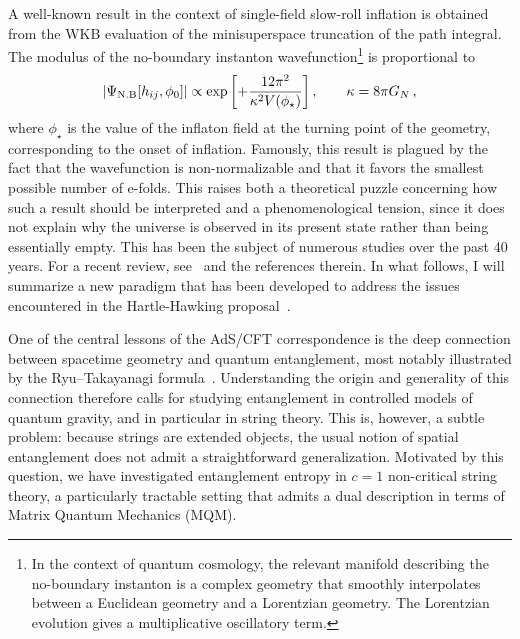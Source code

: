 \documentclass[a4paper]{article}
\begin{document}
A well-known result in the context of single-field slow-roll inflation is obtained from the WKB evaluation of the minisuperspace truncation of the path integral. The modulus of the no-boundary instanton wavefunction\footnote{In the context of quantum cosmology, the relevant manifold describing the no-boundary instanton is a complex geometry that smoothly interpolates between a Euclidean geometry and a Lorentzian geometry. The Lorentzian evolution gives a multiplicative oscillatory term.} is proportional to 
\begin{equation}\label{eq:nobound}
|\Psi_{\rm N.B}[h_{ij}, \phi_0]| \propto \exp\left[+\frac{12\pi^2}{\kappa^2 V(\phi_\star)}\right], \qquad \kappa = 8 \pi G_{N} \,,
\end{equation}
where $\phi_\star$ is the value of the inflaton field at the turning point of the geometry, corresponding to the onset of inflation. Famously, this result is plagued by the fact that the wavefunction is non-normalizable and that it favors the smallest possible number of e-folds. This raises both a theoretical puzzle concerning how such a result should be interpreted and a phenomenological tension, since it does not explain why the universe is observed in its present state rather than being essentially empty. This has been the subject of numerous studies over the past 40 years. For a recent review, see~\cite{Lehners_2023,maldacena2024commentsboundarywavefunctionslow} and the references therein. In what follows, I will summarize a new paradigm that has been developed to address the issues encountered in the Hartle-Hawking proposal~\cite{betzios2024inflationarycosmologyantidesitter,Betzios:2024zhf,Betzios_2026}.

One of the central lessons of the AdS/CFT correspondence is the deep connection between spacetime geometry and quantum entanglement, most notably illustrated by the Ryu–Takayanagi formula~\cite{Ryu_2006,headrick2019lecturesentanglemententropyfield,Nishioka_2009,Jacobson_2016}. Understanding the origin and generality of this connection therefore calls for studying entanglement in controlled models of quantum gravity, and in particular in string theory. This is, however, a subtle problem: because strings are extended objects, the usual notion of spatial entanglement does not admit a straightforward generalization. Motivated by this question, we have investigated entanglement entropy in $c=1$ non-critical string theory, a particularly tractable setting that admits a dual description in terms of Matrix Quantum Mechanics (MQM).
\end{document}
